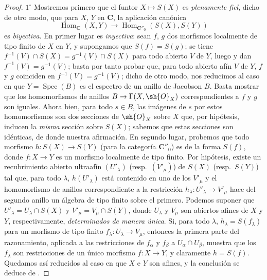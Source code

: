 \begin{proof}
$1^\circ$ Mostremos primero que el funtor $X\mapsto S(X)$ es \emph{plenamente fiel}, dicho de otro modo, que para $X$, $Y$ en $\boldsymbol{C}$, la aplicación canónica
\[
  \operatorname{Hom}_{\mathbf{C}}(X,Y)\to\operatorname{Hom}_{\mathbf{C}''_0}(S(X),S(Y))
\]
es \emph{biyectiva}.
En primer lugar es \emph{inyectiva}: sean $f$, $g$ dos morfismos localmente de tipo finito de $X$ en $Y$, y supongamos que $S(f)=S(g)$; se tiene $f^{-1}(V)\cap S(X)=g^{-1}(V)\cap S(X)$ para todo abierto $V$ de $Y$, luego  y  dan $f^{-1}(V)=g^{-1}(V)$; basta por tanto probar que, para todo abierto afín $V$ de $Y$, $f$ y $g$ coinciden en $f^{-1}(V)=g^{-1}(V)$; dicho de otro modo, nos reducimos al caso en que $Y=\operatorname{Spec}(B)$ es el espectro de un anillo de Jacobson $B$.
Basta  mostrar que los homomorfismos de anillos $B\to\Gamma(X,\sh{O}_X)$ correspondientes a $f$ y $g$ son iguales.
Ahora bien, para todo $s\in B$, las imágenes de $s$ por estos homomorfismos son dos secciones de $\sh{O}_X$ sobre $X$ que, por hipótesis, inducen la \emph{misma} sección sobre $S(X)$; sabemos  que estas secciones son idénticas, de donde nuestra afirmación.
En segundo lugar, probemos que todo morfismo $h:S(X)\to S(Y)$ (para la categoría $\boldsymbol{C}''_0$) es de la forma $S(f)$, donde $f:X\to Y$ es un morfismo localmente de tipo finito.
Por hipótesis, existe un recubrimiento abierto ultraafín $(U'_\lambda)$ (resp.\ $(V'_\mu)$) de $S(X)$ (resp.\ $S(Y)$) tal que, para todo $\lambda$, $h(U'_\lambda)$ está contenido en uno de los $V'_\mu$ y el homomorfismo de anillos correspondiente a la restricción $h_\lambda:U'_\lambda\to V'_\mu$ hace del segundo anillo un álgebra de tipo finito sobre el primero.
Podemos suponer que $U'_\lambda=U_\lambda\cap S(X)$ y $V'_\mu=V_\mu\cap S(Y)$, donde $U_\lambda$ y $V_\mu$ son abiertos afines de $X$ y $Y$, respectivamente, \emph{determinados de manera única}. Si, para todo $\lambda$, $h_\lambda=S(f_\lambda)$ para un morfismo de tipo finito $f_\lambda:U_\lambda\to V_\mu$, entonces la primera parte del razonamiento, aplicada a las restricciones de $f_\alpha$ y $f_\beta$ a $U_\alpha\cap U_\beta$, muestra que los $f_\lambda$ son restricciones de un único morfismo $f:X\to Y$, y claramente $h=S(f)$. Quedamos así reducidos al caso en que $X$ e $Y$ son afines, y la conclusión se deduce de .


\end{proof}
